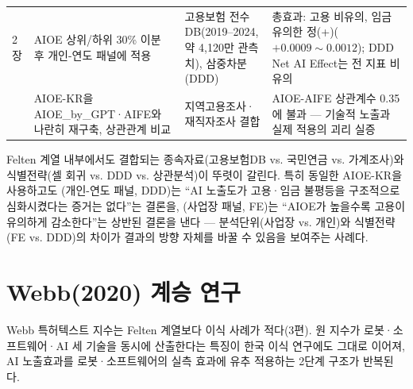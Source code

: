\documentclass[11pt]{article}
\begin{document}
\begin{longtable}{L{2.6cm}L{4.6cm}L{3.9cm}L{4.1cm}}
\citet{noh-2025-ai-labor-coexistence} 2장 &
AIOE 상위/하위 30\% 이분 후 개인-연도 패널에 적용 &
고용보험 전수DB(2019--2024, 약 4{,}120만 관측치), 삼중차분(DDD) &
총효과: 고용 비유의, 임금 유의한 정(+)($+0.0009\sim0.0012$); DDD Net AI Effect는 전 지표 비유의\\

\citet{cheon-2025-ai-exposure-vs-ai-adoption} &
AIOE-KR을 AIOE\_by\_GPT·AIFE와 나란히 재구축, 상관관계 비교 &
지역고용조사·재직자조사 결합 &
AIOE-AIFE 상관계수 0.35에 불과 --- 기술적 노출과 실제 적용의 괴리 실증\\

\end{longtable}

Felten 계열 내부에서도 결합되는 종속자료(고용보험DB vs. 국민연금 vs. 가계조사)와 식별전략(셀 회귀 vs. DDD vs. 상관분석)이 뚜렷이 갈린다. 특히 동일한 AIOE-KR을 사용하고도 \citet{noh-2025-ai-labor-coexistence}(개인-연도 패널, DDD)는 ``AI 노출도가 고용·임금 불평등을 구조적으로 심화시켰다는 증거는 없다''는 결론을, \citet{kiet-2025-ai-occupational-employment-effect}(사업장 패널, FE)는 ``AIOE가 높을수록 고용이 유의하게 감소한다''는 상반된 결론을 낸다 --- 분석단위(사업장 vs. 개인)와 식별전략(FE vs. DDD)의 차이가 결과의 방향 자체를 바꿀 수 있음을 보여주는 사례다.

\section{Webb(2020) 계승 연구}

Webb 특허텍스트 지수는 Felten 계열보다 이식 사례가 적다(3편). 원 지수가 로봇·소프트웨어·AI 세 기술을 동시에 산출한다는 특징이 한국 이식 연구에도 그대로 이어져, AI 노출효과를 로봇·소프트웨어의 실측 효과에 유추 적용하는 2단계 구조가 반복된다.
\end{document}
